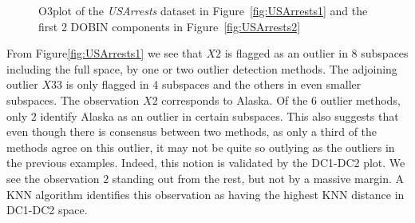 \documentclass[11pt]{article}
\begin{document}
\begin{figure}[!t]
	\centering
	\caption{O3plot of the \textit{USArrests} dataset in Figure~\ref{fig:USArrests1} and the first 2 DOBIN components in Figure~\ref{fig:USArrests2} }
	\label{fig:USArrests}
\end{figure}

From Figure\ref{fig:USArrests1} we see that $X2$ is flagged as an outlier in $8$ subspaces including the full space, by one or two outlier detection methods. The adjoining outlier $X33$  is only flagged in $4$ subspaces and the others in even smaller subspaces.  The observation $X2$ corresponds to Alaska. Of the $6$ outlier methods, only $2$ identify Alaska as an outlier in certain subspaces. This also suggests that even though there is consensus between two methods, as only a third of the methods agree on this outlier, it may not be quite so outlying as the outliers in the previous examples. Indeed, this notion is validated by the DC1-DC2 plot. We see the observation $2$ standing out from the rest, but not by a massive margin. A KNN algorithm identifies this observation as having the highest KNN distance in DC1-DC2 space.   \\   
\end{document}
